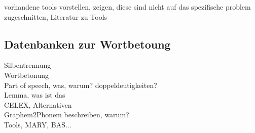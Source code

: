 vorhandene tools vorstellen, zeigen, diese sind nicht auf das spezifische problem zugeschnitten, Literatur zu Tools\\

\subsection{Datenbanken zur Wortbetoung}
Silbentrennung\\
Wortbetonung\\
Part of speech, was, warum? doppeldeutigkeiten?\\
Lemma, was ist das\\
CELEX, Alternativen\\
Graphem2Phonem beschreiben, warum?\\
Tools, MARY, BAS...